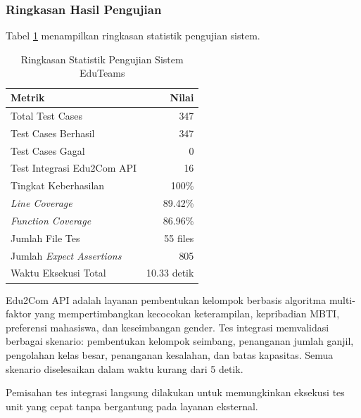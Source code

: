 \subsubsection{Ringkasan Hasil Pengujian}

Tabel \ref{tab:testing-summary} menampilkan ringkasan statistik pengujian sistem.

\begin{table}[H]
	\centering
	\caption{Ringkasan Statistik Pengujian Sistem EduTeams}
	\label{tab:testing-summary}
	\begin{tabular}{|l|r|}
		\hline
		\textbf{Metrik}                   & \textbf{Nilai} \\
		\hline
		Total Test Cases                  & 347            \\
		\hline
		Test Cases Berhasil               & 347            \\
		\hline
		Test Cases Gagal                  & 0              \\
		\hline
		Test Integrasi Edu2Com API        & 16             \\
		\hline
		Tingkat Keberhasilan              & 100\%          \\
		\hline
		\textit{Line Coverage}            & 89.42\%        \\
		\hline
		\textit{Function Coverage}        & 86.96\%        \\
		\hline
		Jumlah File Tes                   & 55 files       \\
		\hline
		Jumlah \textit{Expect Assertions} & 805            \\
		\hline
		Waktu Eksekusi Total              & 10.33 detik    \\
		\hline
	\end{tabular}
\end{table}

\noindent
Edu2Com API adalah layanan pembentukan kelompok berbasis algoritma multi-faktor yang mempertimbangkan kecocokan keterampilan, kepribadian MBTI, preferensi mahasiswa, dan keseimbangan gender. Tes integrasi memvalidasi berbagai skenario: pembentukan kelompok seimbang, penanganan jumlah ganjil, pengolahan kelas besar, penanganan kesalahan, dan batas kapasitas. Semua skenario diselesaikan dalam waktu kurang dari 5 detik.

\noindent
Pemisahan tes integrasi langsung dilakukan untuk memungkinkan eksekusi tes unit yang cepat tanpa bergantung pada layanan eksternal.





